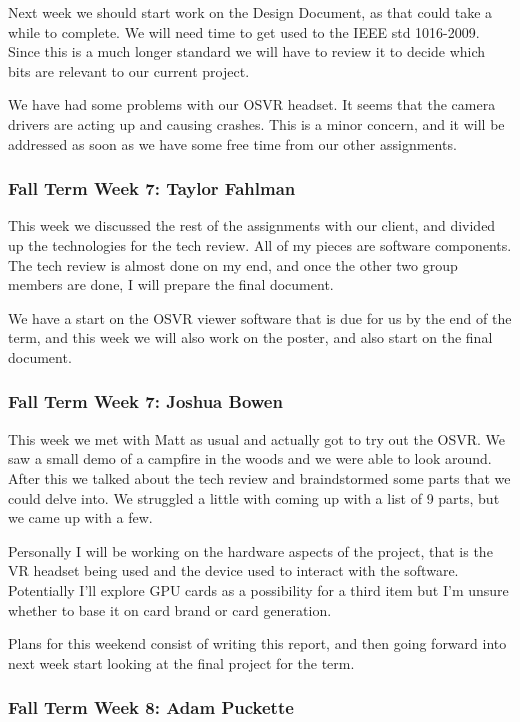\documentclass[draftclsnofoot,onecolumn]{IEEEtran}
\begin{document}
Next week we should start work on the Design Document, as that could take a while to complete. We will need time to get used to the IEEE std 1016-2009. Since this is a much longer standard we will have to review it to decide which bits are relevant to our current project.

We have had some problems with our OSVR headset. It seems that the camera drivers are acting up and causing crashes. This is a minor concern, and it will be addressed as soon as we have some free time from our other assignments.

\subsubsection{Fall Term Week 7: Taylor Fahlman}

This week we discussed the rest of the assignments with our client, and divided up the technologies for the tech review. All of my pieces are software components. The tech review is almost done on my end, and once the other two group members are done, I will prepare the final document.

We have a start on the OSVR viewer software that is due for us by the end of the term, and this week we will also work on the poster, and also start on the final document.

\subsubsection{Fall Term Week 7: Joshua Bowen}

This week we met with Matt as usual and actually got to try out the OSVR. We saw a small demo of a campfire in the woods and we were able to look around. After this we talked about the tech review and braindstormed some parts that we could delve into. We struggled a little with coming up with a list of 9 parts, but we came up with a few.

Personally I will be working on the hardware aspects of the project, that is the VR headset being used and the device used to interact with the software. Potentially I'll explore GPU cards as a possibility for a third item but I'm unsure whether to base it on card brand or card generation.

Plans for this weekend consist of writing this report, and then going forward into next week start looking at the final project for the term.

\subsubsection{Fall Term Week 8: Adam Puckette}
\end{document}
